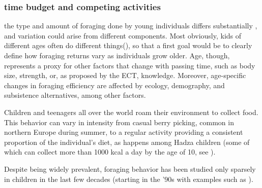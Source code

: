  
\subsubsection{time budget and competing activities}




the type and amount of foraging done by young individuals differs substantially , and variation could arise from different components.
Most obviously, kids of different ages often do different things(\cite{}), so that a first goal would be to clearly define how foraging returns vary as individuals grow older. Age, though, represents a proxy for other factors that change with passing time, such as body size, strength, or, as proposed by the ECT, knowledge. Moreover, age-specific changes in foraging efficiency are affected by ecology, demography, and subsistence alternatives, among other factors. 




















Children and teenagers all over the world roam their environment to collect food. This behavior can vary in intensity from casual berry picking, common in northern Europe during summer, to a regular activity providing a consistent proportion of the individual's diet, as happens among Hadza children (some of which can collect more than 1000 kcal a day by the age of 10, see \cite{crittenden_juvenile_2013}). 



Despite being widely prevalent, foraging behavior has been studied only sparsely in children in the last few decades (starting in the '90s with examples such as \cite{blurton_jones_modelling_1989, blurton_jones_foraging_1994, blurton_jones_why_1997, bird_children_1995}).

